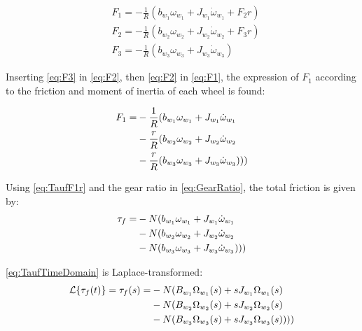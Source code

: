 \begin{subequations} 
	\begin{flalign}
		&F_1 = -\frac{1}{R} (b_{w_1}\omega_{w_1} + J_{w_1}\dot{\omega}_{w_1} + F_2r) 	\label{eq:F1}\\ 
		&F_2 = -\frac{1}{R} (b_{w_2}\omega_{w_2} +  J_{w_2}\dot{\omega}_{w_2} + F_3r)	\label{eq:F2}\\
		&F_3 = -\frac{1}{R} (b_{w_3}\omega_{w_3} + J_{w_3}\dot{\omega}_{w_3})			\label{eq:F3}
	\end{flalign}
\end{subequations}

Inserting \autoref{eq:F3} in \autoref{eq:F2}, then \autoref{eq:F2} in \autoref{eq:F1}, the expression of $F_1$ according to the friction and moment of inertia of each wheel is found:

\begin{subequations} 
	\begin{flalign}
	F_1 = &-\frac{1}{R} (b_{w_1}\omega_{w_1} + J_{w_1}\dot{\omega}_{w_1} \notag \\
	& -\frac{r}{R} (b_{w_2}\omega_{w_2} + J_{w_2}\dot{\omega}_{w_2} \notag \\
	& -\frac{r}{R} (b_{w_3}\omega_{w_3} + J_{w_3}\dot{\omega}_{w_3})))
	\end{flalign}
\end{subequations}


Using \autoref{eq:TaufF1r} and the gear ratio in \autoref{eq:GearRatio}, the total friction is given by: 
\begin{subequations} 
	\begin{flalign} \label{eq:TaufTimeDomain}
	\tau_f = &-N (b_{w_1}\omega_{w_1} + J_{w_1}\dot{\omega}_{w_1} \notag \\
	& -N (b_{w_2}\omega_{w_2} + J_{w_2}\dot{\omega}_{w_2} \notag \\
	& -N (b_{w_3}\omega_{w_3} + J_{w_3}\dot{\omega}_{w_3})))
	\end{flalign}
\end{subequations}

\autoref{eq:TaufTimeDomain} is Laplace-transformed:
\begin{subequations} 
	\begin{flalign} \label{eq:TaufLaplaceDomain}
	\mathcal{L}\{\tau_f(t)\} = \tau_f(s) = &-N (B_{w_1}\Omega_{w_1}(s) + sJ_{w_1}\Omega_{w_1}(s) \notag \\
	& -N (B_{w_2}\Omega_{w_2}(s) + sJ_{w_2}\Omega_{w_2}(s) \notag \\
	& -N (B_{w_3}\Omega_{w_3}(s) + sJ_{w_3}\Omega_{w_3}(s))))
	\end{flalign}
\end{subequations}

